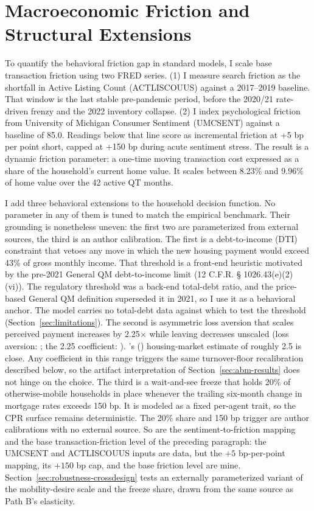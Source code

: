 \documentclass[12pt]{article}
\newcommand{\citepos}[1]{\citeauthor{#1}'s (\citeyear{#1})}
\begin{document}
\section{Macroeconomic Friction and Structural Extensions}\label{sec:method-frictions}

To quantify the behavioral friction gap in standard models, I scale base transaction friction using two FRED series. (1) I measure search friction as the shortfall in Active Listing Count (ACTLISCOUUS) against a 2017--2019 baseline. That window is the last stable pre-pandemic period, before the 2020/21 rate-driven frenzy and the 2022 inventory collapse. (2) I index psychological friction from University of Michigan Consumer Sentiment (UMCSENT) against a baseline of 85.0. Readings below that line score as incremental friction at +5 bp per point short, capped at +150 bp during acute sentiment stress. The result is a dynamic friction parameter: a one-time moving transaction cost expressed as a share of the household's current home value. It scales between 8.23\% and 9.96\% of home value over the 42 active QT months.

I add three behavioral extensions to the household decision function. No parameter in any of them is tuned to match the empirical benchmark. Their grounding is nonetheless uneven: the first two are parameterized from external sources, the third is an author calibration. The first is a debt-to-income (DTI) constraint that vetoes any move in which the new housing payment would exceed 43\% of gross monthly income. That threshold is a front-end heuristic motivated by the pre-2021 General QM debt-to-income limit (12 C.F.R. \S{} 1026.43(e)(2)(vi)). The regulatory threshold was a back-end total-debt ratio, and the price-based General QM definition superseded it in 2021, so I use it as a behavioral anchor. The model carries no total-debt data against which to test the threshold (Section~\ref{sec:limitations}). The second is asymmetric loss aversion that scales perceived payment increases by 2.25$\times$ while leaving decreases unscaled (loss aversion: \citealp{kahneman1979}; the 2.25 coefficient: \citealp{tversky1992}). \citepos{andersen2022} housing-market estimate of roughly 2.5 is close. Any coefficient in this range triggers the same turnover-floor recalibration described below, so the artifact interpretation of Section~\ref{sec:abm-results} does not hinge on the choice. The third is a wait-and-see freeze that holds 20\% of otherwise-mobile households in place whenever the trailing six-month change in mortgage rates exceeds 150 bp. It is modeled as a fixed per-agent trait, so the CPR surface remains deterministic. The 20\% share and 150 bp trigger are author calibrations with no external source. So are the sentiment-to-friction mapping and the base transaction-friction level of the preceding paragraph: the UMCSENT and ACTLISCOUUS inputs are data, but the $+5$ bp-per-point mapping, its $+150$ bp cap, and the base friction level are mine. Section~\ref{sec:robustness-crossdesign} tests an externally parameterized variant of the mobility-desire scale and the freeze share, drawn from the same source as Path B's elasticity.
\end{document}
